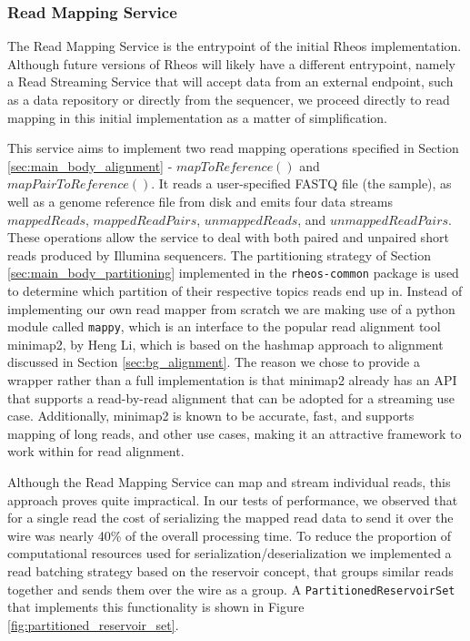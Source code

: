 \subsubsection{Read Mapping Service}

The Read Mapping Service is the entrypoint of the initial Rheos implementation. Although future versions of Rheos will likely have a different entrypoint, namely a Read Streaming Service that will accept data from an external endpoint, such as a data repository or directly from the sequencer, we proceed directly to read mapping in this initial implementation as a matter of simplification. 

This service aims to implement two read mapping operations specified in Section \ref{sec:main_body_alignment} - $mapToReference()$ and $mapPairToReference()$. It reads a user-specified FASTQ file (the sample), as well as a genome reference file from disk and emits four data streams $mappedReads$, $mappedReadPairs$, $unmappedReads$, and $unmappedReadPairs$. These operations allow the service to deal with both paired and unpaired short reads produced by Illumina sequencers. The partitioning strategy of Section \ref{sec:main_body_partitioning} implemented in the \texttt{rheos-common} package is used to determine which partition of their respective topics reads end up in. Instead of implementing our own read mapper from scratch we are making use of a python module called \texttt{mappy}, which is an interface to the popular read alignment tool minimap2\autocite{Li2018}, by Heng Li, which is based on the hashmap approach to alignment discussed in Section \ref{sec:bg_alignment}. The reason we chose to provide a wrapper rather than a full implementation is that minimap2 already has an API that supports a read-by-read alignment that can be adopted for a streaming use case. Additionally, minimap2 is known to be accurate, fast, and supports mapping of long reads, and other use cases, making it an attractive framework to work within for read alignment.

Although the Read Mapping Service can map and stream individual reads, this approach proves quite impractical. In our tests of performance, we observed that for a single read the cost of serializing the mapped read data to send it over the wire was nearly 40\% of the overall processing time. To reduce the proportion of computational resources used for serialization/deserialization we implemented a read batching strategy based on the reservoir concept, that groups similar reads together and sends them over the wire as a group. A \texttt{PartitionedReservoirSet} that implements this functionality is shown in Figure \ref{fig:partitioned_reservoir_set}.

